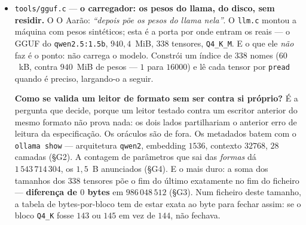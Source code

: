 \documentclass[11pt]{article}
\newcommand{\code}[1]{\texttt{\small #1}}
\theoremstyle{plain}
\theoremstyle{remark}
\begin{document}
\begin{itemize}
E a \textbf{matmul lê do disco linha a linha}: em RAM nunca há mais do que uma linha, tenha a
matriz mil linhas ou um milhão --- §L3 confirma-a contra o mesmo produto feito em RAM, e §L6 contra
um bloco inteiro (RMSNorm $\to$ projeção $\to$ RoPE $\to$ atenção $\to$ residual) refeito pelo
caminho direto. §L7 repete o desenho do \code{mmu.c} §M5: RAM plana enquanto o modelo em disco
cresce $16\times$, com \textbf{controlo positivo} a subir $+8192$~kB, batendo
$8192\times256\times4$~B ao número.

\emph{E uma asserção anterior era VAZIA.} A causalidade era testada estragando $V$ nas posições
$\ge$ corte --- posições que a função, com o laço \code{t < T} e \code{T=corte}, \textbf{nunca lê}.
Não existia entrada capaz de a fazer falhar, e ela passava verde a afirmar o que não testava. Agora
mede-se a sequência inteira, cada posição contra o seu prefixo, e o teste tem \emph{duas} metades:
o passado não pode mexer-se \textbf{e} o presente tem de mexer-se --- sem a segunda, um ``não mudou
nada'' trivial voltaria a passar por causalidade. Mutando a máscara para trás, o medidor apanha:
$80$ componentes do passado movem-se e ele falha.

\item \code{tools/gguf.c} --- \textbf{o carregador: os pesos do llama, do disco, sem residir.} O
O Aarão: \emph{``depois põe os pesos do llama nela''}. O \code{llm.c} montou a máquina com pesos
sintéticos; esta é a porta por onde entram os reais --- o GGUF do \code{qwen2.5:1.5b}, $940{,}4$~MiB,
$338$ tensores, \code{Q4\_K\_M}. E o que ele \emph{não} faz é o ponto: não carrega o modelo.
Constrói um índice de $338$ nomes ($60$~kB, contra $940$~MiB de pesos --- $1$ para $16000$) e lê
cada tensor por \code{pread} quando é preciso, largando-o a seguir.

\textbf{Como se valida um leitor de formato sem ser contra si próprio?} É a pergunta que decide,
porque um leitor testado contra um escritor anterior do mesmo formato não prova nada: os dois lados
partilhariam o anterior erro de leitura da especificação. Os oráculos são de fora. Os metadados batem com
o \code{ollama show} --- arquitetura \code{qwen2}, embedding $1536$, contexto $32768$, $28$ camadas
(§G2). A contagem de parâmetros que sai das \emph{formas} dá $1\,543\,714\,304$, os $1{,}5$~B
anunciados (§G4). E o mais duro: a soma dos tamanhos dos $338$ tensores põe o fim do último
exatamente no fim do ficheiro --- \textbf{diferença de $0$ bytes} em $986\,048\,512$ (§G3). Num
ficheiro deste tamanho, a tabela de bytes-por-bloco tem de estar exata ao byte para fechar assim: se
o bloco \code{Q4\_K} fosse $143$ ou $145$ em vez de $144$, não fechava.


\end{itemize}
\end{document}
